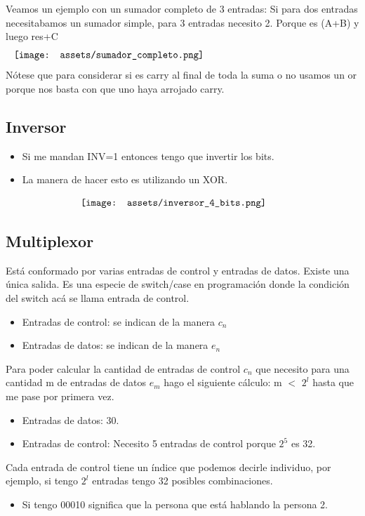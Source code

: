 \documentclass[10pt,a4paper]{article}
\begin{document}
Veamos un ejemplo con un sumador completo de 3 entradas: Si para dos entradas necesitabamos un sumador simple, para 3 entradas necesito 2. Porque es (A+B) y luego res+C
\[\begin{minipage}[b]{1\textwidth}
    \texttt{[image: assets/sumador\_completo.png]}
    \label{fig:sumador_completo}
\end{minipage}\]
Nótese que para considerar si es carry al final de toda la suma o no usamos un or porque nos basta con que uno haya arrojado carry.

\subsection*{Inversor}
\begin{itemize}
    \item Si me mandan INV=1 entonces tengo que invertir los bits.
    \item La manera de hacer esto es utilizando un XOR.
\end{itemize} 
\[\begin{minipage}[b]{0.6\textwidth}
    \texttt{[image: assets/inversor\_4\_bits.png]}
    \label{fig:inversor_4_bits}
\end{minipage}\]


\subsection*{Multiplexor}
Está conformado por varias entradas de control y entradas de datos. Existe una única salida. Es una especie de switch/case en programación donde la condición del switch acá se llama entrada de control.
\begin{itemize}
    \item Entradas de control: se indican de la manera \(c_{n}\)
    \item Entradas de datos: se indican de la manera \(e_{n}\)
\end{itemize} 
Para poder calcular la cantidad de entradas de control \(c_{n}\) que necesito para una cantidad m de entradas de datos \(e_{m}\) hago el siguiente cálculo: m \(<\) \(2^{l}\) hasta que me pase por primera vez.
\begin{itemize}
    \item Entradas de datos: 30.
    \item Entradas de control: Necesito 5 entradas de control porque \(2^{5}\) es 32.
\end{itemize} 
Cada entrada de control tiene un índice que podemos decirle individuo, por ejemplo, si tengo \(2^{l}\) entradas tengo 32 posibles combinaciones.
\begin{itemize}
    \item Si tengo 00010 significa que la persona que está hablando la persona 2.
\end{itemize}
\end{document}
